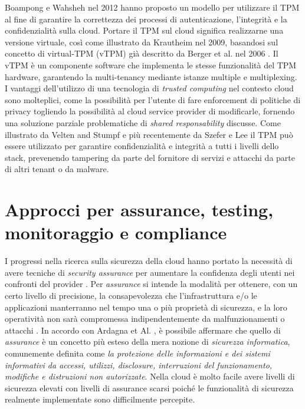 \documentclass[../main.tex]{subfiles}
\begin{document}
Boampong e Wahsheh nel 2012 \cite{Boampong:2012:DFS:2331762.2331767} hanno proposto un modello per utilizzare il TPM al fine di garantire la correttezza dei processi di autenticazione, l'integrità e la confidenzialità sulla cloud.
Portare il TPM sul cloud significa realizzarne una versione virtuale, così come illustrato da Krautheim \cite{Krautheim:2009:PVI:1855533.1855538} nel 2009, basandosi sul concetto di virtual-TPM (vTPM) già descritto da Berger et al. nel 2006 \cite{Berger:2006:VVT:1267336.1267357}.
Il vTPM è un componente software che implementa le stesse funzionalità del TPM hardware, garantendo la multi-tenancy mediante istanze multiple e multiplexing.
I vantaggi dell'utilizzo di una tecnologia di \textit{trusted computing} nel contesto cloud sono molteplici, come la possibilità per l'utente di fare enforcement di politiche di privacy togliendo la possibilità al cloud service provider di modificarle, fornendo una soluzione parziale problematiche di \textit{shared responsability} discusse. 
Come illustrato da Velten and Stumpf \cite{Velten2013} e più recentemente da Szefer e Lee \cite{SzeferLee} il TPM può essere utilizzato per garantire confidenzialità e integrità a tutti i livelli dello stack, prevenendo tampering da parte del fornitore di servizi e attacchi da parte di altri tenant o da malware.


\section{Approcci per assurance, testing, monitoraggio e compliance}
I progressi nella ricerca sulla sicurezza della cloud hanno portato la necessità di avere tecniche di \textit{security assurance} per aumentare la confidenza degli utenti nei confronti del provider \cite{6814039}.
Per \textit{assurance} si intende la modalità per ottenere, con un certo livello di precisione, la consapevolezza che l'infrastruttura e/o le applicazioni manterranno nel tempo una o più proprietà di sicurezza, e la loro operatività non sarà compromessa indipendentemente da malfunzionamenti o attacchi \cite{goertzel2007software}.
In accordo con Ardagna et Al. \cite{Ardagna:2015:SAC:2808687.2767005}, è possibile affermare che quello di \textit{assurance} è un concetto più esteso della mera nozione di \textit{sicurezza informatica}, comunemente definita come \textit{la protezione delle informazioni e dei sistemi informativi da accessi, utilizzi, disclosure, interruzioni del funzionamento, modifiche e distruzioni non autorizzate}.
Nella cloud è molto facile avere livelli di sicurezza elevati con livelli di assurance scarsi poiché le funzionalità di sicurezza realmente implementate sono difficilmente percepite. 
\end{document}
